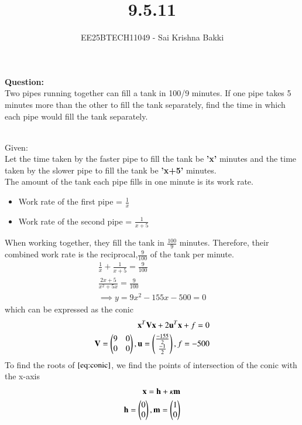 \documentclass[journal]{IEEEtran}
\begin{document}

\vspace{3cm}

\title{9.5.11}
\author{EE25BTECH11049 - Sai Krishna Bakki}
\maketitle
\textbf{Question:}\\
Two pipes running together can fill a tank in 100/9 minutes. If one pipe takes 5 minutes more than the other to fill the tank separately, find the time in which each pipe would
fill the tank separately.

\solution\\
Given:\\
Let the time taken by the faster pipe to fill the tank be \textbf{'x'} minutes and the time taken by the slower pipe to fill the tank be \textbf{'x+5'} minutes.\\
The amount of the tank each pipe fills in one minute is its work rate.
\begin{itemize}
    \item Work rate of the first pipe = $\frac{1}{x}$
    \item Work rate of the second pipe = $\frac{1}{x+5}$
\end{itemize}
When working together, they fill the tank in $\frac{100}{9}$ minutes. Therefore, their combined work rate is the reciprocal,$\frac{9}{100}$ of the tank per minute.
\begin{align}
    \frac{1}{x}+\frac{1}{x+5}=\frac{9}{100}\\
    \frac{2x+5}{x^2+5x}=\frac{9}{100}\\
    \implies y=9x^2-155x-500=0\label{eq:conic}
\end{align}
which can be expressed as the conic
\begin{align}
\mathbf{x}^{T}\mathbf{V}\mathbf{x}+2\mathbf{u}^T\mathbf{x}+f=0\\
\mathbf{V}=\begin{pmatrix}9&0\\0&0\end{pmatrix},\mathbf{u}=\begin{pmatrix}\frac{-155}{2}\\\frac{-1}{2}\end{pmatrix},f=-500
\end{align}
To find the roots of $\eqref{eq:conic}$, we find the points of intersection of the conic with the x-axis
\begin{align}
    \mathbf{x}=\mathbf{h}+\kappa\mathbf{m}\\
    \mathbf{h}=\begin{pmatrix}0\\0\end{pmatrix},\mathbf{m=\begin{pmatrix}1\\0\end{pmatrix}}
\end{align}
\end{document}
